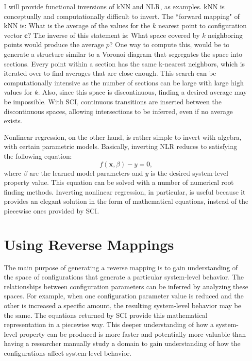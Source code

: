 I will provide functional inversions of kNN and NLR, as examples.
kNN is conceptually and computationally difficult to invert.
The ``forward mapping" of kNN is:
What is the average of the values for the $k$ nearest point to configuration vector $\mathbf c$?
The inverse of this statement is:
What space covered by $k$ neighboring points would produce the average $p$?
One way to compute this, would be to generate a structure similar to a Voronoi diagram that segregates the space into sections.
Every point within a section has the same k-nearest neighbors, which is iterated over to find averages that are close enough.
This search can be computationally intensive as the number of sections can be large with large high values for $k$.
Also, since this space is discontinuous, finding a desired average may be impossible.
With SCI, continuous transitions are inserted between the discontinuous spaces, allowing intersections to be inferred, even if no average exists.

Nonlinear regression, on the other hand, is rather simple to invert with algebra, with certain parametric models.
Basically, inverting NLR reduces to satisfying the following equation:
\[f(\mathbf x, \beta) - y = 0,\]
where $\beta$ are the learned model parameters and $y$ is the desired system-level property value.
This equation can be solved with a number of numerical root finding methods.
Inverting nonlinear regression, in particular, is useful because it provides an elegant solution in the form of mathematical equations, instead of the piecewise ones provided by SCI.


\section{Using Reverse Mappings}
The main purpose of generating a reverse mapping is to gain understanding of the space of configurations that generate a particular system-level behavior.
The relationships between configuration parameters can be inferred by analyzing these spaces.
For example, when one configuration parameter value is reduced and the other is increased a specific amount, the resulting system-level behavior may be the same.
The equations returned by SCI provide this mathematical representation in a piecewise way.
This deeper understanding of how a system-level property can be produced is more faster and potentially more valuable than having a researcher manually study a domain to gain understanding of how the configurations affect system-level behavior.

